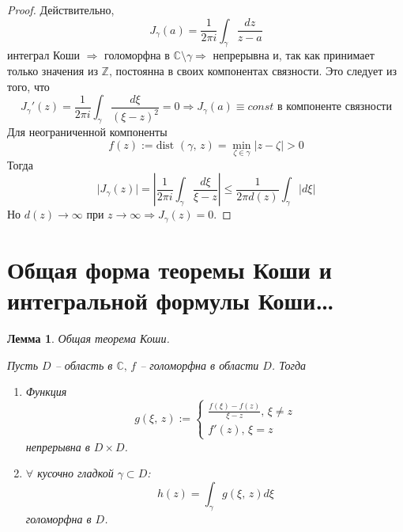 \documentclass[a4paper,12pt]{article}
\renewcommand{\leq}{\ensuremath{\leqslant}}
\theoremstyle{plain}
\newtheorem{lemma}{Лемма}[section]
\theoremstyle{definition}
\theoremstyle{remark}
\begin{document}
\begin{proof}
	Действительно,
	\[
		J_\gamma(a) = \frac{1}{2\pi i}\int_\gamma\frac{dz}{z - a}
	\]
	интеграл Коши $\Rightarrow$ голоморфна в $\mathbb{C} \setminus \gamma \Rightarrow$ непрерывна и, так как принимает только значения из $\mathbb{Z}$, постоянна в своих компонентах связности. Это следует из того, что
	\[
		J_\gamma'(z) = \frac{1}{2\pi i} \int_\gamma\frac{d\xi}{(\xi - z)^2} = 0 \Rightarrow J_\gamma(a) \equiv const \text{ в компоненте связности}
	\]
	Для неограниченной компоненты
	\[
		f(z) := \text{dist }(\gamma,\, z) = \min_{\zeta \in \gamma}\vert z - \zeta\vert > 0
	\]
	Тогда
	\[
		\vert J_\gamma(z)\vert = \left\vert\frac{1}{2\pi i}\int_\gamma\frac{d\xi}{\xi - z}\right\vert \leq \frac{1}{2\pi d(z)}\int_\gamma\vert d\xi\vert
	\]
	Но $d(z) \to \infty$ при $z \to \infty \Rightarrow J_\gamma(z) = 0$.
\end{proof}

\section{Общая форма теоремы Коши и интегральной формулы Коши\dots}
\begin{lemma}
	Общая теорема Коши.

	Пусть $D$ -- область в $\mathbb{C},\, f$ -- голоморфна в области $D$. Тогда
	\begin{enumerate}
		\item Функция
		      \[
			      g(\xi,\, z) := \begin{cases}
				      \frac{f(\xi) - f(z)}{\xi - z},\, \xi \neq z \\
				      f'(z),\, \xi = z
			      \end{cases}
		      \]
		      непрерывна в $D \times D$.
		\item $\forall$ кусочно гладкой $\gamma \subset D$:
		      \[
			      h(z) = \int_\gamma g(\xi,\, z)d\xi
		      \]
		      голоморфна в $D$.
	\end{enumerate}
\end{lemma}
\end{document}
